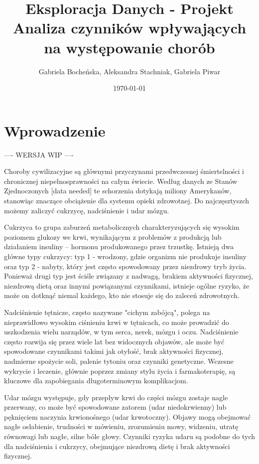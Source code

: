 \documentclass[onecolumn,12pt]{article}
\begin{document}
\title{Eksploracja Danych - Projekt\\
Analiza czynników wpływających na występowanie chorób}
\author{Gabriela Bocheńska, Aleksandra Stachniak, Gabriela Piwar}
\date{\today}
\maketitle

\tableofcontents
\thispagestyle{empty}
\newpage

\section{Wprowadzenie}

---- WERSJA WIP ---- 

Choroby cywilizacyjne są głównymi przyczynami przedwczesnej śmiertelności i chronicznej niepełnosprawności na całym świecie. Według danych ze Stanów Zjednoczonych [data needed] te schorzenia dotykają miliony Amerykanów, stanowiąc znaczące obciążenie dla systemu opieki zdrowotnej. Do najczęsztyszch możemy zaliczyć cukrzycę, nadciśnienie i udar mózgu.

Cukrzyca to grupa zaburzeń metabolicznych charakteryzujących się wysokim poziomem glukozy we krwi, wynikającym z problemów z produkcją lub działaniem insuliny – hormonu produkowanego przez trzustkę. Istnieją dwa główne typy cukrzycy: typ 1 - wrodzony, gdzie organizm nie produkuje insuliny oraz typ 2 - nabyty, który jest często spowodowany przez niezdrowy tryb życia. Ponieważ
drugi typ jest ściśle związany z nadwagą, brakiem aktywności fizycznej, niezdrową dietą oraz innymi powiązanymi czynnikami, istnieje ogólne ryzyko, że może on dotknąć niemal każdego, kto nie stosuje się do zaleceń zdrowotnych.

Nadciśnienie tętnicze, często nazywane "cichym zabójcą", polega na nieprawidłowo wysokim ciśnieniu krwi w tętnicach, co może prowadzić do uszkodzenia wielu narządów, w tym serca, nerek, mózgu i oczu. Nadciśnienie często rozwija się przez wiele lat bez widocznych objawów, ale może być spowodowane czynnikami takimi jak otyłość, brak aktywności fizycznej, nadmierne spożycie soli, palenie tytoniu oraz czynniki genetyczne. Wczesne wykrycie i leczenie, głównie poprzez zmiany stylu życia i farmakoterapię, są kluczowe dla zapobiegania długoterminowym komplikacjom.

Udar mózgu występuje, gdy przepływ krwi do części mózgu zostaje nagle przerwany, co może być spowodowane zatorem (udar niedokrwienny) lub pęknięciem naczynia krwionośnego (udar krwotoczny). Objawy mogą obejmować nagłe osłabienie, trudności w mówieniu, zrozumieniu mowy, widzeniu, utratę równowagi lub nagłe, silne bóle głowy. Czynniki ryzyka udaru są podobne do tych dla nadciśnienia i cukrzycy, obejmujące niezdrową dietę i brak aktywności fizycznej.
\end{document}
